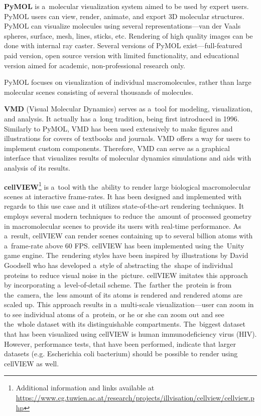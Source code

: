 \documentclass[
  digital, %
  table,   %
  nolof,     %
  nolot,     %
  oneside,
]{fithesis3}
\begin{document}

\textbf{PyMOL} \cite{PyMOL} is a molecular visualization system aimed to be used by expert users. PyMOL users can view, render, animate, and export 3D molecular structures. PyMOL can visualize molecules using several representations—van der Vaals spheres, surface, mesh, lines, sticks, etc. Rendering of high quality images can be done with internal ray caster. Several versions of PyMOL exist—full-featured paid version, open source version with limited functionality, and educational version aimed for academic, non-professional research only.

PyMOL focuses on visualization of individual macromolecules, rather than large molecular scenes consisting of several thousands of molecules.

\textbf{VMD} (Visual Molecular Dynamics) \cite{HUMP96} serves as a tool for modeling, visualization, and analysis. It actually has a long tradition, being first introduced in 1996. Similarly to PyMOL, VMD has been used extensively to make figures and illustrations for covers of textbooks and journals. VMD offers a way for users to implement custom components. Therefore, VMD can serve as a graphical interface that visualizes results of molecular dynamics simulations and aids with analysis of its results.

\textbf{cellVIEW}\footnote{Additional information and links available at \url{https://www.cg.tuwien.ac.at/research/projects/illvisation/cellview/cellview.php}} \cite{cellVIEW_2015} is a tool with the ability to render large biological macromolecular scenes at interactive frame-rates. It has been designed and implemented with regards to this use case and it utilizes state-of-the-art rendering techniques. It employs several modern techniques to reduce the amount of processed geometry in macromolecular scenes to provide its users with real-time performance. As a result, cellVIEW can render scenes containing up to several billion atoms with a frame-rate above 60 FPS. cellVIEW has been implemented using the Unity game engine. The rendering styles have been inspired by illustrations by David Goodsell who has developed a style of abstracting the shape of individual proteins to reduce visual noise in the picture. cellVIEW imitates this approach by incorporating a level-of-detail scheme. The farther the protein is from the camera, the less amount of its atoms is rendered and rendered atoms are scaled up. This approach results in a multi-scale visualization—user can zoom in to see individual atoms of a protein, or he or she can zoom out and see the whole dataset with its distinguishable compartments. The biggest dataset that has been visualized using cellVIEW is human immunodeficiency virus (HIV). However, performance tests, that have been performed, indicate that larger datasets (e.g. Escherichia coli bacterium) should be possible to render using cellVIEW as well.
\end{document}
